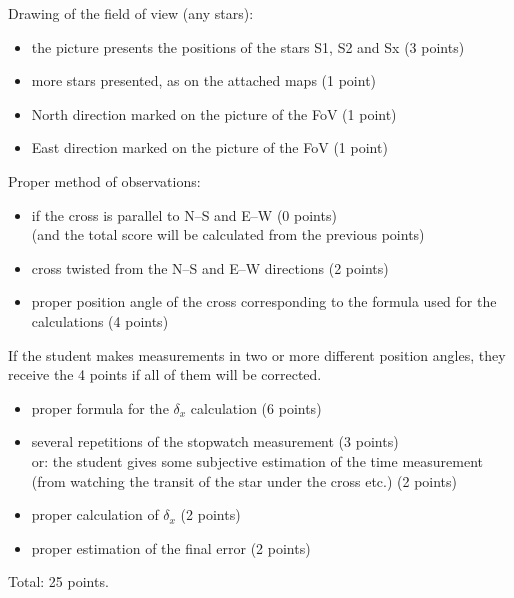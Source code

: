 Drawing of the field of view (any stars):
\begin{itemize}
\item the picture presents the positions of the stars S1, S2 and Sx
  \hfill(3 points)
\item more stars presented, as on the attached maps \hfill(1 point)
\item North direction marked on the picture of the FoV \hfill(1 point)
\item East direction marked on the picture of the FoV \hfill(1 point)
\end{itemize}

Proper method of observations:
\begin{itemize}
\item if the cross is parallel to N--S and E--W \hfill(0 points)\\
  (and the total score will be calculated from the previous points)
\item cross twisted from the N--S and E--W directions \hfill(2 points)
\item proper position angle of the cross corresponding to the formula used
  for the calculations \hfill(4 points)
\end{itemize}
If the student makes measurements in two or more different position angles,
they receive the 4 points if all of them will be corrected. %

\begin{itemize}
\item proper formula for the $\delta_x$ calculation \hfill(6 points)
\item several repetitions of the stopwatch measurement \hfill(3 points)\\
  or: the student gives some subjective estimation of the time measurement
  (from watching the transit of the star under the cross etc.)
  \hfill(2 points)
\item proper calculation of $\delta_x$ \hfill(2 points)
\item proper estimation of the final error \hfill(2 points)
\end{itemize}

Total: 25 points.
